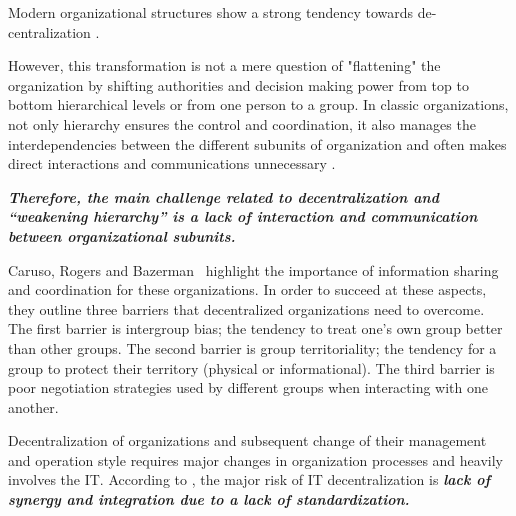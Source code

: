 


Modern organizational structures show a strong tendency towards de-centralization \cite{daft1993}.

However, this transformation is not a mere question of "flattening" the organization by shifting authorities and decision making power from top to bottom hierarchical levels or from one person to a group. In classic organizations, not only hierarchy ensures the control and coordination, it also manages the interdependencies between the different subunits of organization and often makes direct interactions and communications unnecessary \cite{thompson1967}. 

\textit{\textbf{Therefore, the main challenge related to decentralization and ``weakening hierarchy'' is a lack of interaction and communication between organizational subunits. }}

Caruso, Rogers and Bazerman~\cite{caruso2008boundaries} highlight the importance of information sharing and coordination for these organizations. In order to succeed at these aspects, they outline three barriers that decentralized organizations need to overcome. The first barrier is intergroup bias; the tendency to treat one's own group better than other groups. The second barrier is group territoriality; the tendency for a group to protect their territory (physical or informational). The third barrier is poor negotiation strategies used by different groups when interacting with one another. 

Decentralization of organizations and subsequent change of their management and operation style requires major changes in organization processes and heavily involves the IT. According to \cite{Rockart1996}, the major risk of IT decentralization is\textbf{\textit{ lack of  synergy and integration due to a lack of standardization. }}



